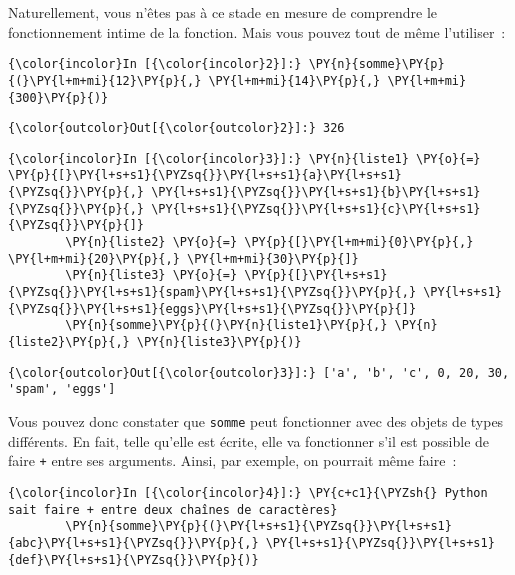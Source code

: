     Naturellement, vous n'êtes pas à ce stade en mesure de comprendre le
fonctionnement intime de la fonction. Mais vous pouvez tout de même
l'utiliser~:

    \begin{Verbatim}[commandchars=\\\{\},frame=single,framerule=0.3mm,rulecolor=\color{cellframecolor}]
{\color{incolor}In [{\color{incolor}2}]:} \PY{n}{somme}\PY{p}{(}\PY{l+m+mi}{12}\PY{p}{,} \PY{l+m+mi}{14}\PY{p}{,} \PY{l+m+mi}{300}\PY{p}{)}
\end{Verbatim}


\begin{Verbatim}[commandchars=\\\{\},frame=single,framerule=0.3mm,rulecolor=\color{cellframecolor}]
{\color{outcolor}Out[{\color{outcolor}2}]:} 326
\end{Verbatim}
            
    \begin{Verbatim}[commandchars=\\\{\},frame=single,framerule=0.3mm,rulecolor=\color{cellframecolor}]
{\color{incolor}In [{\color{incolor}3}]:} \PY{n}{liste1} \PY{o}{=} \PY{p}{[}\PY{l+s+s1}{\PYZsq{}}\PY{l+s+s1}{a}\PY{l+s+s1}{\PYZsq{}}\PY{p}{,} \PY{l+s+s1}{\PYZsq{}}\PY{l+s+s1}{b}\PY{l+s+s1}{\PYZsq{}}\PY{p}{,} \PY{l+s+s1}{\PYZsq{}}\PY{l+s+s1}{c}\PY{l+s+s1}{\PYZsq{}}\PY{p}{]}
        \PY{n}{liste2} \PY{o}{=} \PY{p}{[}\PY{l+m+mi}{0}\PY{p}{,} \PY{l+m+mi}{20}\PY{p}{,} \PY{l+m+mi}{30}\PY{p}{]}
        \PY{n}{liste3} \PY{o}{=} \PY{p}{[}\PY{l+s+s1}{\PYZsq{}}\PY{l+s+s1}{spam}\PY{l+s+s1}{\PYZsq{}}\PY{p}{,} \PY{l+s+s1}{\PYZsq{}}\PY{l+s+s1}{eggs}\PY{l+s+s1}{\PYZsq{}}\PY{p}{]}
        \PY{n}{somme}\PY{p}{(}\PY{n}{liste1}\PY{p}{,} \PY{n}{liste2}\PY{p}{,} \PY{n}{liste3}\PY{p}{)}
\end{Verbatim}


\begin{Verbatim}[commandchars=\\\{\},frame=single,framerule=0.3mm,rulecolor=\color{cellframecolor}]
{\color{outcolor}Out[{\color{outcolor}3}]:} ['a', 'b', 'c', 0, 20, 30, 'spam', 'eggs']
\end{Verbatim}
            
    Vous pouvez donc constater que \texttt{somme} peut fonctionner avec des
objets de types différents. En fait, telle qu'elle est écrite, elle va
fonctionner s'il est possible de faire \texttt{+} entre ses arguments.
Ainsi, par exemple, on pourrait même faire~:

    \begin{Verbatim}[commandchars=\\\{\},frame=single,framerule=0.3mm,rulecolor=\color{cellframecolor}]
{\color{incolor}In [{\color{incolor}4}]:} \PY{c+c1}{\PYZsh{} Python sait faire + entre deux chaînes de caractères}
        \PY{n}{somme}\PY{p}{(}\PY{l+s+s1}{\PYZsq{}}\PY{l+s+s1}{abc}\PY{l+s+s1}{\PYZsq{}}\PY{p}{,} \PY{l+s+s1}{\PYZsq{}}\PY{l+s+s1}{def}\PY{l+s+s1}{\PYZsq{}}\PY{p}{)}
\end{Verbatim}


